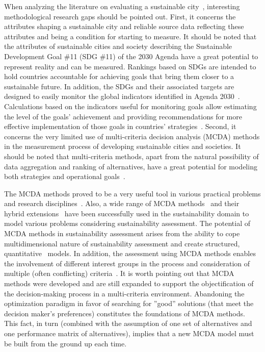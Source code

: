 \documentclass[final,5p,times,twocolumn,authoryear]{elsarticle}
\begin{document}
When analyzing the literature on evaluating a sustainable city~\citep{reis2019evaluation, yi2019evaluation}, interesting methodological research gaps should be pointed out. First, it concerns the attributes shaping a sustainable city and reliable source data reflecting these attributes and being a condition for starting to measure. It should be noted that the attributes of sustainable cities and society describing the Sustainable Development Goal \#11 (SDG \#11) of the 2030 Agenda have a great potential to represent reality and can be measured. Rankings based on SDGs are intended to hold countries accountable for achieving goals that bring them closer to a sustainable future. In addition, the SDGs and their associated targets are designed to easily monitor the global indicators identified in Agenda 2030~\citep{miola2019measuring, koch2018contextualize}. Calculations based on the indicators useful for monitoring goals allow estimating the level of the goals' achievement and providing recommendations for more effective implementation of those goals in countries' strategies~\citep{boto2020implementation}. Second, it concerns the very limited use of multi-criteria decision analysis (MCDA) methods in the measurement process of developing sustainable cities and societies. It should be noted that multi-criteria methods, apart from the natural possibility of data aggregation and ranking of alternatives, have a great potential for modeling both strategies and operational goals~\citep{modibbo2021multi}.

The MCDA methods proved to be a very useful tool in various practical problems and research disciplines~\citep{cegan2017trends, marttunen2017structuring}. Also, a wide range of MCDA methods~\citep{figueira2005multiple} and their hybrid extensions~\citep{cinelli2014analysis} have been successfully used in the sustainability domain to model various problems considering sustainability assessment. The potential of MCDA methods in sustainability assessment arises from the ability to cope multidimensional nature of sustainability assessment and create structured, quantitative~\citep{oppio2018assessing} models. In addition, the assessment using MCDA methods enables the involvement of different interest groups in the process and consideration of multiple (often conflicting) criteria~\citep{fernandes2018assessing, bhardwaj2019more}. It is worth pointing out that MCDA methods were developed and are still expanded to support the objectification of the decision-making process in a multi-criteria environment. Abandoning the optimization paradigm in favor of searching for ''good'' solutions (that meet the decision maker's preferences) constitutes the foundations of MCDA methods. This fact, in turn (combined with the assumption of one set of alternatives and one performance matrix of alternatives), implies that a new MCDA model must be built from the ground up each time.
\end{document}
